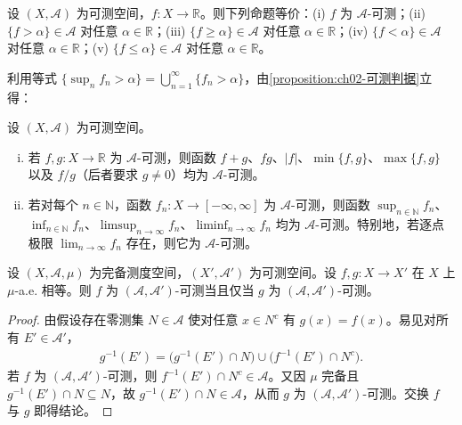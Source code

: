 \documentclass[../../main.tex]{subfiles}%
\begin{document}
\begin{proposition}\label{proposition:ch02-可测判据}\label{proposition:ch02-Borel判定}
设 $(X,\mathscr A)$ 为可测空间，$f:X\to\mathbb R$。则下列命题等价：(i) $f$ 为 $\mathscr A$-可测；(ii) $\{f>\alpha\}\in\mathscr A$ 对任意 $\alpha\in\mathbb R$；(iii) $\{f\geqslant\alpha\}\in\mathscr A$ 对任意 $\alpha\in\mathbb R$；(iv) $\{f<\alpha\}\in\mathscr A$ 对任意 $\alpha\in\mathbb R$；(v) $\{f\leqslant\alpha\}\in\mathscr A$ 对任意 $\alpha\in\mathbb R$。
\end{proposition}

利用等式 $\{\sup_n f_n>\alpha\}=\bigcup_{n=1}^\infty\{f_n>\alpha\}$，由\cref{proposition:ch02-可测判据}立得：

\begin{corollary}\label{corollary:ch02-可测运算}\label{corollary:ch02-逐点极限}
设 $(X,\mathscr A)$ 为可测空间。
\begin{enumerate}[(i)]
\item 若 $f,g:X\to\mathbb R$ 为 $\mathscr A$-可测，则函数 $f+g$、$fg$、$|f|$、$\min\{f,g\}$、$\max\{f,g\}$ 以及 $f/g$（后者要求 $g\neq0$）均为 $\mathscr A$-可测。
\item 若对每个 $n\in\mathbb N$，函数 $f_n:X\to[-\infty,\infty]$ 为 $\mathscr A$-可测，则函数 $\sup_{n\in\mathbb N}f_n$、$\inf_{n\in\mathbb N}f_n$、$\limsup_{n\to\infty}f_n$、$\liminf_{n\to\infty}f_n$ 均为 $\mathscr A$-可测。特别地，若逐点极限 $\lim_{n\to\infty}f_n$ 存在，则它为 $\mathscr A$-可测。
\end{enumerate}
\end{corollary}

\begin{proposition}\label{proposition:ch02-a.e.相等可测}
设 $(X,\mathscr A,\mu)$ 为完备测度空间，$(X',\mathscr A')$ 为可测空间。设 $f,g:X\to X'$ 在 $X$ 上 $\mu$-a.e. 相等。则 $f$ 为 $(\mathscr A,\mathscr A')$-可测当且仅当 $g$ 为 $(\mathscr A,\mathscr A')$-可测。
\end{proposition}

\begin{proof}
由假设存在零测集 $N\in\mathscr A$ 使对任意 $x\in N^c$ 有 $g(x)=f(x)$。易见对所有 $E'\in\mathscr A'$，
\begin{align*}
g^{-1}(E')=\bigl(g^{-1}(E')\cap N\bigr)\cup\bigl(f^{-1}(E')\cap N^c\bigr).
\end{align*}
若 $f$ 为 $(\mathscr A,\mathscr A')$-可测，则 $f^{-1}(E')\cap N^c\in\mathscr A$。又因 $\mu$ 完备且 $g^{-1}(E')\cap N\subseteq N$，故 $g^{-1}(E')\cap N\in\mathscr A$，从而 $g$ 为 $(\mathscr A,\mathscr A')$-可测。交换 $f$ 与 $g$ 即得结论。
\end{proof}
\end{document}
